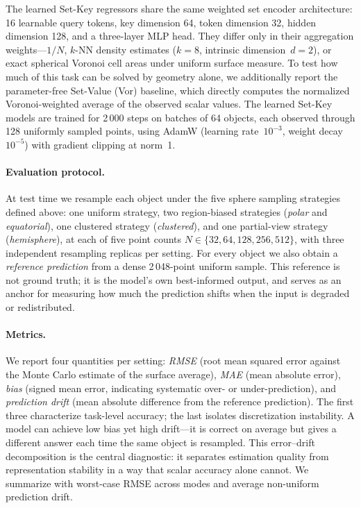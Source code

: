 \documentclass[11pt]{article}
\begin{document}
The learned Set-Key regressors share the same weighted set encoder
architecture: 16 learnable query tokens, key dimension 64, token dimension 32,
hidden dimension 128, and a three-layer MLP head.  They differ only in their
aggregation weights---$1/N$, $k$-NN density estimates ($k{=}8$, intrinsic
dimension~$d{=}2$), or exact spherical Voronoi cell areas under uniform
surface measure.  To test how much of this task can be solved by geometry
alone, we additionally report the parameter-free Set-Value (Vor) baseline, which
directly computes the normalized Voronoi-weighted average of the observed scalar
values.
The learned Set-Key models are trained for 2\,000 steps on
batches of 64 objects, each observed through 128 uniformly sampled points,
using AdamW (learning rate~$10^{-3}$, weight decay~$10^{-5}$) with gradient
clipping at norm~1.

\paragraph{Evaluation protocol.}
At test time we resample each object under the five sphere sampling strategies
defined above: one uniform strategy, two region-biased strategies
(\emph{polar} and \emph{equatorial}), one clustered strategy
(\emph{clustered}), and one partial-view strategy (\emph{hemisphere}), at each
of five point counts
$N\in\{32,64,128,256,512\}$, with three independent resampling replicas per
setting.  For every object we also obtain a \emph{reference prediction} from a
dense 2\,048-point uniform sample.  This reference is not ground truth; it is
the model's own best-informed output, and serves as an anchor for measuring how
much the prediction shifts when the input is degraded or redistributed.

\paragraph{Metrics.}
We report four quantities per setting:
\emph{RMSE} (root mean squared error against the Monte Carlo estimate of the surface average),
\emph{MAE} (mean absolute error),
\emph{bias} (signed mean error, indicating systematic over- or
under-prediction), and
\emph{prediction drift} (mean absolute difference from the reference
prediction).
The first three characterize task-level accuracy; the last isolates
discretization instability.  A model can achieve low bias yet high drift---it
is correct on average but gives a different answer each time the same object
is resampled.  This error--drift decomposition is the central diagnostic:
it separates estimation quality from representation stability in a way
that scalar accuracy alone cannot.  We summarize with worst-case RMSE across
modes and average non-uniform prediction drift.
\end{document}
